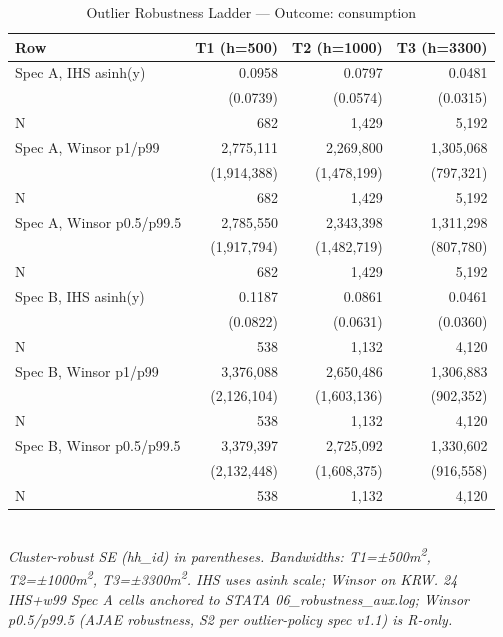 \begin{table}[t]
\centering
\caption{Outlier Robustness Ladder --- Outcome: consumption}
\label{tab:rob_outlier_consumption_en}
\begin{tabular}{lrrr}
\toprule
Row & T1 (h=500) & T2 (h=1000) & T3 (h=3300) \\
\midrule
Spec A, IHS asinh(y) & 0.0958 & 0.0797 & 0.0481 \\
        & (0.0739) & (0.0574) & (0.0315) \\
N       & 682 & 1,429 & 5,192 \\
Spec A, Winsor p1/p99 & 2,775,111 & 2,269,800 & 1,305,068 \\
        & (1,914,388) & (1,478,199) & (797,321) \\
N       & 682 & 1,429 & 5,192 \\
Spec A, Winsor p0.5/p99.5 & 2,785,550 & 2,343,398 & 1,311,298 \\
        & (1,917,794) & (1,482,719) & (807,780) \\
N       & 682 & 1,429 & 5,192 \\
Spec B, IHS asinh(y) & 0.1187 & 0.0861 & 0.0461 \\
        & (0.0822) & (0.0631) & (0.0360) \\
N       & 538 & 1,132 & 4,120 \\
Spec B, Winsor p1/p99 & 3,376,088 & 2,650,486 & 1,306,883 \\
        & (2,126,104) & (1,603,136) & (902,352) \\
N       & 538 & 1,132 & 4,120 \\
Spec B, Winsor p0.5/p99.5 & 3,379,397 & 2,725,092 & 1,330,602 \\
        & (2,132,448) & (1,608,375) & (916,558) \\
N       & 538 & 1,132 & 4,120 \\
\bottomrule
\end{tabular}
\\
\footnotesize\textit{Cluster-robust SE (hh\_id) in parentheses. Bandwidths: T1=±500m\textsuperscript{2}, T2=±1000m\textsuperscript{2}, T3=±3300m\textsuperscript{2}. IHS uses asinh scale; Winsor on KRW. 24 IHS+w99 Spec A cells anchored to STATA 06\_robustness\_aux.log; Winsor p0.5/p99.5 (AJAE robustness, S2 per outlier-policy spec v1.1) is R-only.}
\end{table}


